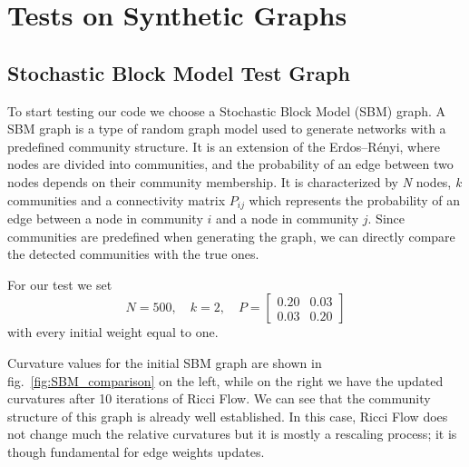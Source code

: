 \section{Tests on Synthetic Graphs}\label{sec5.2}
\subsection{Stochastic Block Model Test Graph}
To start testing our code we choose a Stochastic Block Model (SBM) graph. A SBM graph is a type of random graph model used to generate networks with a predefined community structure. It is an extension of the Erdos--R\'enyi, where nodes are divided into communities, and the probability of an edge between two nodes depends on their community membership. It is characterized by \textit{N} nodes, \textit{k} communities and a connectivity matrix \textit{$P_{ij}$} which represents the probability of an edge between a node in community $i$ and a node in community $j$.
Since communities are predefined when generating the graph, we can directly compare the detected communities with the true ones.

For our test we set 
\begin{equation*}
    N = 500, \quad k = 2, \quad
    P =
    \begin{bmatrix} 
        0.20 & 0.03 \\
        0.03 & 0.20
    \end{bmatrix}
\end{equation*}
with every initial weight equal to one.

Curvature values for the initial SBM graph are shown in fig.~\ref{fig:SBM_comparison} on the left, while on the right we have the updated curvatures after 10 iterations of Ricci Flow. We can see that the community structure of this graph is already well established. In this case, Ricci Flow does not change much the relative curvatures but it is mostly a rescaling process; it is though fundamental for edge weights updates.

